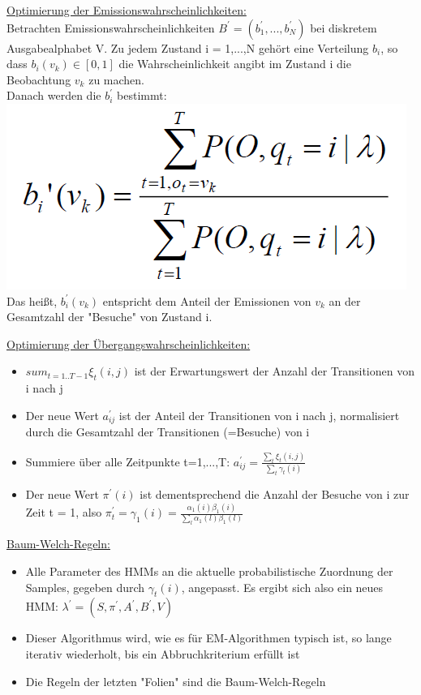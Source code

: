 \documentclass[a4paper,10pt,oneside]{article}
\begin{document}
\underline{Optimierung der Emissionswahrscheinlichkeiten:} \\
Betrachten Emissionswahrscheinlichkeiten $B^{'}=(b_1^{'},...,b_N^{'})$ bei diskretem Ausgabealphabet V. Zu jedem Zustand i = 1,...,N gehört eine Verteilung $b_i$, so dass $b_i(v_k) \in  [0,1]$ die Wahrscheinlichkeit angibt im Zustand i die Beobachtung $v_k$ zu machen. \\
Danach werden die $b_i^{'}$ bestimmt: \includegraphics[scale=0.2]{Grafiken/bis.png}\\
Das heißt, $b_i^{'}(v_k)$ entspricht dem Anteil der Emissionen von $v_k$ an der Gesamtzahl der "Besuche" von Zustand i.
	
	
\underline{Optimierung der Übergangswahrscheinlichkeiten:} 	
	\begin{itemize}
		\item $sum_{t=1..T-1} \xi_t(i,j)$ ist der Erwartungswert der Anzahl der Transitionen von i nach j
		\item Der neue Wert $a_{ij}^{'}$ ist der Anteil der Transitionen von i nach j, normalisiert durch die Gesamtzahl der Transitionen (=Besuche) von i 
		\item Summiere über alle Zeitpunkte t=1,...,T: $a_{ij}^{'} = \frac{\sum_t \xi_t(i,j)}{\sum_t \gamma_t(i)}$
		\item Der neue Wert $\pi^{'}(i)$ ist dementsprechend die Anzahl der Besuche von i zur Zeit t = 1, also $\pi_t^{'} = \gamma_1(i) = \frac{\alpha_1(i)\beta_1(i)}{\sum_l \alpha_1(l)\beta_1(l)}$
	\end{itemize}
 		
\underline{Baum-Welch-Regeln:} \\ 	
	\begin{itemize}
		\item Alle Parameter des HMMs an die aktuelle probabilistische Zuordnung der Samples, gegeben durch $\gamma_t(i)$, angepasst. Es ergibt sich also ein neues HMM: $\lambda^{'} = (S,\pi^{'},A^{'},B^{'},V)$
		\item Dieser Algorithmus wird, wie es für EM-Algorithmen typisch ist, so lange iterativ wiederholt, bis ein Abbruchkriterium erfüllt ist
		\item Die Regeln der letzten "Folien" sind die Baum-Welch-Regeln
	\end{itemize}
	
\end{document}
